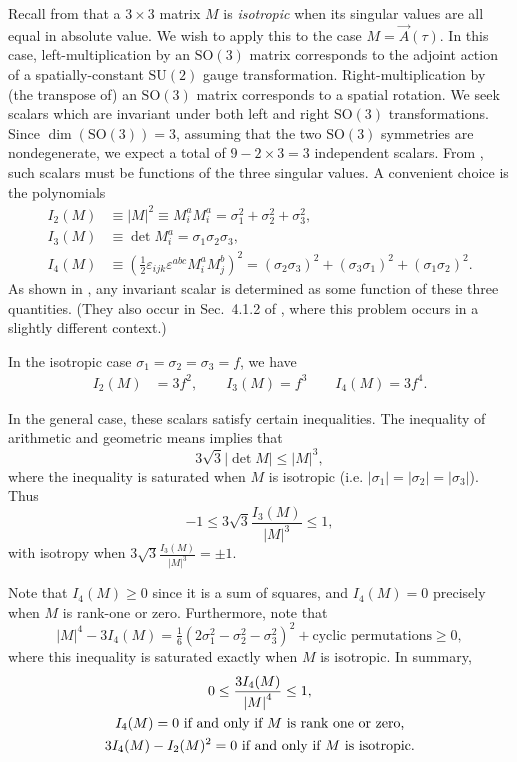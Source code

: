 Recall from  that a $3\times3$ matrix $M$ is \emph{isotropic} when its singular values are all equal in absolute value. We wish to apply this to the case $M=\vec{A}(\tau)$. In this case, left-multiplication by an $\mathrm{SO}(3)$ matrix corresponds to the adjoint action of a spatially-constant $\mathrm{SU}(2)$ gauge transformation. Right-multiplication by (the transpose of) an $\mathrm{SO}(3)$ matrix corresponds to a spatial rotation. We seek scalars which are invariant under both left and right $\mathrm{SO}(3)$ transformations. Since $\dim(\mathrm{SO}(3))=3$, assuming that the two $\mathrm{SO}(3)$ symmetries are nondegenerate, we expect a total of $9-2\times3=3$ independent scalars. From , such scalars must be functions of the three singular values. A convenient choice is the polynomials 
\begin{align}
I_{2}(M) & \equiv\left|M\right|^{2}\equiv M_{i}^{a}M_{i}^{a}=\sigma_{1}^{2}+\sigma_{2}^{2}+\sigma_{3}^{2},\label{eq:def-invariants}\\
I_{3}(M) & \equiv\det M_{i}^{a}=\sigma_{1}\sigma_{2}\sigma_{3},\nonumber \\
I_{4}(M) & \equiv\left(\tfrac{1}{2}\varepsilon_{ijk}\varepsilon^{abc}M_{i}^{a}M_{j}^{b}\right)^{2}=\left(\sigma_{2}\sigma_{3}\right)^{2}+\left(\sigma_{3}\sigma_{1}\right)^{2}+\left(\sigma_{1}\sigma_{2}\right)^{2}.\nonumber 
\end{align}
 As shown in , any invariant scalar is determined as some function of these three quantities. (They also occur in Sec.~4.1.2 of \cite{mares2010}, where this problem occurs in a slightly different context.)

In the isotropic case $\sigma_{1}=\sigma_{2}=\sigma_{3}=f$, we have 
\begin{align*}
I_{2}(M) & =3f^{2},\qquad I_{3}(M)=f^{3}\qquad I_{4}(M)=3f^{4}.
\end{align*}

In the general case, these scalars satisfy certain inequalities. The inequality of arithmetic and geometric means implies that 
\[
3\sqrt{3}\left|\det M\right|\leq\left|M\right|^{3},
\]
 where the inequality is saturated when $M$ is isotropic (i.e. $\left|\sigma_{1}\right|=\left|\sigma_{2}\right|=\left|\sigma_{3}\right|$). Thus 
\[
-1\leq3\sqrt{3}\frac{I_{3}(M)}{\left|M\right|^{3}}\leq1,
\]
 with isotropy when $3\sqrt{3}\frac{I_{3}(M)}{\left|M\right|^{3}}=\pm1$. 

Note that $I_{4}(M)\geq0$ since it is a sum of squares, and $I_{4}(M)=0$ precisely when $M$ is rank-one or zero. Furthermore, note that 
\[
\left|M\right|^{4}-3I_{4}(M)=\tfrac{1}{6}(2\sigma_{1}^{2}-\sigma_{2}^{2}-\sigma_{3}^{2})^{2}+\textrm{cyclic permutations}\geq0,
\]
 where this inequality is saturated exactly when $M$ is isotropic. In summary,
\begin{gather}
0\leq\frac{3I_{4}(M)}{\left|M\right|^{4}}\leq1,\\
I_{4}(M)=0\textrm{ if and only if \ensuremath{M} is rank one or zero,}\label{eq:two-sv-vanish}\\
3I_{4}(M)-I_{2}(M)^{2}=0\textrm{ if and only if \ensuremath{M} is isotropic.}\label{eq:isotropy-characterization}
\end{gather}

